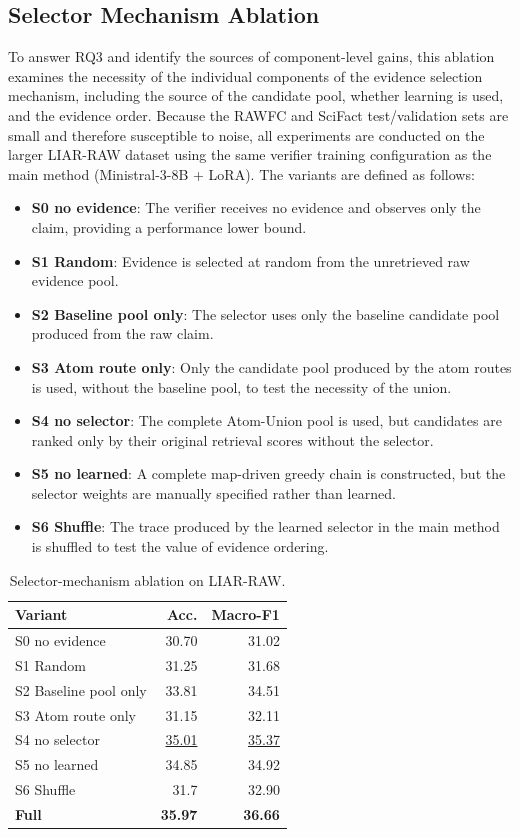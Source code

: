 \documentclass[letterpaper]{article}
\begin{document}
\subsection{Selector Mechanism Ablation}

To answer RQ3 and identify the sources of component-level gains, this ablation examines the necessity of the individual components of the evidence selection mechanism, including the source of the candidate pool, whether learning is used, and the evidence order. Because the RAWFC and SciFact test/validation sets are small and therefore susceptible to noise, all experiments are conducted on the larger LIAR-RAW dataset using the same verifier training configuration as the main method (Ministral-3-8B + LoRA). The variants are defined as follows:

\begin{itemize}
\item \textbf{S0 no evidence}: The verifier receives no evidence and observes only the claim, providing a performance lower bound.
\item \textbf{S1 Random}: Evidence is selected at random from the unretrieved raw evidence pool.
\item \textbf{S2 Baseline pool only}: The selector uses only the baseline candidate pool produced from the raw claim.
\item \textbf{S3 Atom route only}: Only the candidate pool produced by the atom routes is used, without the baseline pool, to test the necessity of the union.
\item \textbf{S4 no selector}: The complete Atom-Union pool is used, but candidates are ranked only by their original retrieval scores without the selector.
\item \textbf{S5 no learned}: A complete map-driven greedy chain is constructed, but the selector weights are manually specified rather than learned.
\item \textbf{S6 Shuffle}: The trace produced by the learned selector in the main method is shuffled to test the value of evidence ordering.
\end{itemize}

\begin{table}[t]
\centering
{\small
\setlength{\tabcolsep}{3pt}
\begin{tabularx}{\columnwidth}{@{}Y r r@{}}
\toprule
\textbf{Variant} & \textbf{Acc.} & \textbf{Macro-F1} \\
\midrule
S0 no evidence & 30.70 & 31.02 \\
S1 Random & 31.25 & 31.68 \\
S2 Baseline pool only & 33.81 & 34.51 \\
S3 Atom route only & 31.15 & 32.11 \\
S4 no selector & \underline{35.01} & \underline{35.37} \\
S5 no learned & 34.85 & 34.92 \\
S6 Shuffle & 31.7 & 32.90 \\
\textbf{Full} & \textbf{35.97} & \textbf{36.66} \\
\bottomrule
\end{tabularx}
}
\caption{Selector-mechanism ablation on LIAR-RAW.}
\label{tab:selector-ablation}
\end{table}
\end{document}
